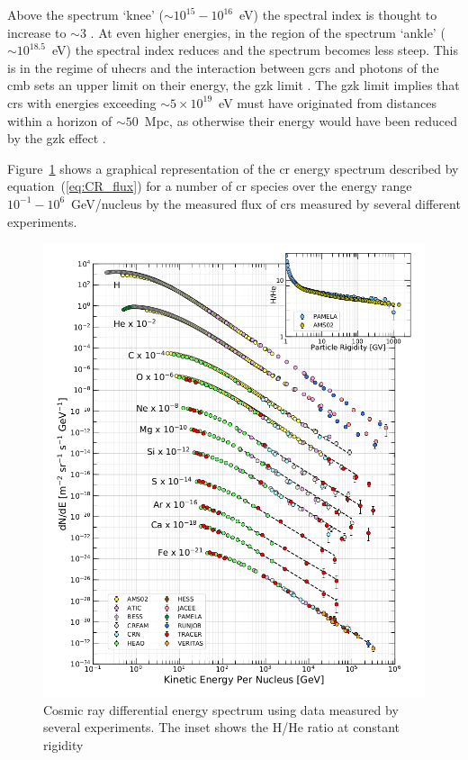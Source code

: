 Above the spectrum `knee' ($\sim10^{15}-10^{16}$~eV) the spectral index is thought to increase to $\sim3$ \citep{particle_data_group_review_2020}. At even higher energies, in the region of the spectrum `ankle' ($\sim10^{18.5}$~eV) the spectral index reduces and the spectrum becomes less steep. This is in the regime of \glspl{uhecr} and the interaction between \glspl{gcr} and photons of the \gls{cmb} sets an upper limit on their energy, the \gls{gzk} limit \citep{particle_data_group_review_2020}. The \gls{gzk} limit implies that \glspl{cr} with energies exceeding $\sim5\times10^{19}$~eV must have originated from distances within a horizon of $\sim50$~Mpc, as otherwise their energy would have been reduced by the \gls{gzk} effect \citep{particle_data_group_review_2020}. 

Figure~\ref{fig:CR_spec} shows a graphical representation of the \gls{cr} energy spectrum described by equation~(\ref{eq:CR_flux}) for a number of \gls{cr} species over the energy range $10^{-1}-10^{6}$~GeV/nucleus by the measured flux of \glspl{cr} measured by several different experiments.

\begin{figure}[ht!]
	\centering
	\includegraphics[width=0.8\columnwidth]{CR_spectrum.png}
	\caption{ Cosmic ray differential energy spectrum using data measured by several experiments. The inset shows the H/He ratio at constant rigidity \citep{particle_data_group_review_2020} }
	\label{fig:CR_spec}
\end{figure}


